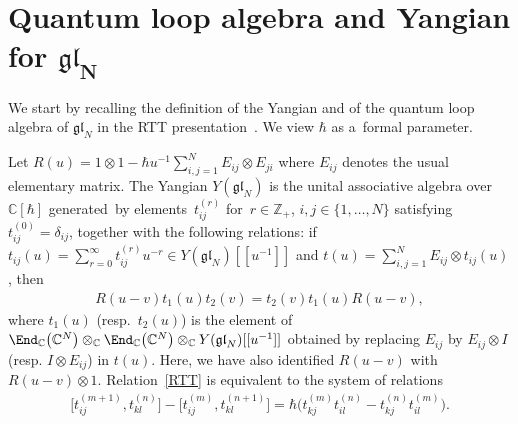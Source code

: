 \section[Quantum loop algebra and Yangian for $\mathfrak{gl}_N$]{Quantum loop algebra and Yangian for $\boldsymbol{\mathfrak{gl}_N}$}

We start by recalling the def\/inition of the Yangian and of the quantum loop algebra of $\mathfrak{gl}_N$ in
the RTT presentation~\cite{FRT}.
We view $\hbar$ as a~formal parameter.

\begin{definition}
\label{Ygln}
Let $R(u) = 1 \otimes 1 - \hbar u^{-1} \sum\limits_{i,j=1}^N E_{ij} \otimes E_{ji} $ where $E_{ij}$ denotes the usual
elementary matrix.
The Yangian $Y(\mathfrak{gl}_N)$ is the unital associative algebra over $\mathbb{C}[\hbar]$ generated~by
elements~$t_{ij}^{(r)}$ for~$r\in\mathbb{Z}_+$, $i,j \in \{1,\ldots,N\}$ satisfying $t_{ij}^{(0)}=\delta_{ij}$, together
with the following relations: if $t_{ij}(u)=\sum\limits_{r=0}^\infty {t_{ij}^{(r)}u^{-r}} \in
Y(\mathfrak{gl}_N)[[u^{-1}]]$ and $t(u) =\sum\limits_{i,j=1}^N {E_{ij} \otimes t_{ij}(u)}$, then
\begin{gather}
R(u-v)t_1(u)t_2(v)=t_2(v)t_1(u)R(u-v),
\label{RTT}
\end{gather}
where $t_1(u)$ (resp.\ $t_2(u)$) is the element of $\End_{\mathbb{C}}\big(\mathbb{C}^N\big) \otimes_{\mathbb{C}}
\End_{\mathbb{C}}\big(\mathbb{C}^N\big) \otimes_{\mathbb{C}} Y(\mathfrak{gl}_N)[[u^{-1}]]$ obtained by replacing
$E_{ij}$ by $E_{ij} \otimes I$ (resp.
$I \otimes E_{ij}$) in $t(u)$.
Here, we have also identif\/ied $R(u-v)$ with $R(u-v)\otimes 1$.
Relation~\eqref{RTT} is equivalent to the system of relations
\begin{gather*}
\big[t_{ij}^{(m+1)},t_{kl}^{(n)}\big]-\big[t_{ij}^{(m)},t_{kl}^{(n+1)}\big]
= \hbar\big(t_{kj}^{(m)}t_{il}^{(n)}-t_{kj}^{(n)}t_{il}^{(m)}\big).
\end{gather*}
\end{definition}

